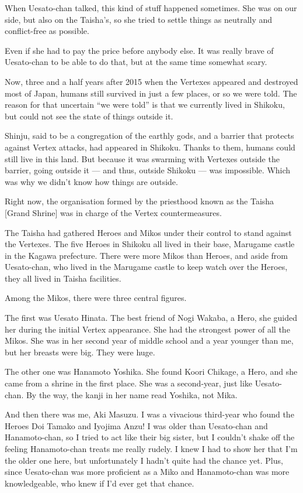When Uesato-chan talked, this kind of stuff happened sometimes. She was on our side, but also on the Taisha's, so she tried to settle things as neutrally and conflict-free as possible.

Even if she had to pay the price before anybody else. It was really brave of Uesato-chan to be able to do that, but at the same time somewhat scary.

Now, three and a half years after 2015 when the Vertexes appeared and destroyed most of Japan, humans still survived in just a few places, or so we were told. The reason for that uncertain ``we were told'' is that we currently lived in Shikoku, but could not see the state of things outside it.

Shinju, said to be a congregation of the earthly gods, and a barrier that protects against Vertex attacks, had appeared in Shikoku. Thanks to them, humans could still live in this land. But because it was swarming with Vertexes outside the barrier, going outside it --- and thus, outside Shikoku --- was impossible. Which was why we didn't know how things are outside.

Right now, the organisation formed by the priesthood known as the Taisha [Grand Shrine] was in charge of the Vertex countermeasures.

The Taisha had gathered Heroes and Mikos under their control to stand against the Vertexes. The five Heroes in Shikoku all lived in their base, Marugame castle in the Kagawa prefecture. There were more Mikos than Heroes, and aside from Uesato-chan, who lived in the Marugame castle to keep watch over the Heroes, they all lived in Taisha facilities.

Among the Mikos, there were three central figures.

The first was Uesato Hinata. The best friend of Nogi Wakaba, a Hero, she guided her during the initial Vertex appearance. She had the strongest power of all the Mikos. She was in her second year of middle school and a year younger than me, but her breasts were big. They were huge.

The other one was Hanamoto Yoshika. She found Koori Chikage, a Hero, and she came from a shrine in the first place. She was a second-year, just like Uesato-chan. By the way, the kanji in her name read Yoshika, not Mika.

And then there was me, Aki Masuzu. I was a vivacious third-year who found the Heroes Doi Tamako and Iyojima Anzu! I was older than Uesato-chan and Hanamoto-chan, so I tried to act like their big sister, but I couldn't shake off the feeling Hanamoto-chan treats me really rudely. I knew I had to show her that I'm the older one here, but unfortunately I hadn't quite had the chance yet. Plus, since Uesato-chan was more proficient as a Miko and Hanamoto-chan was more knowledgeable, who knew if I'd ever get that chance.

